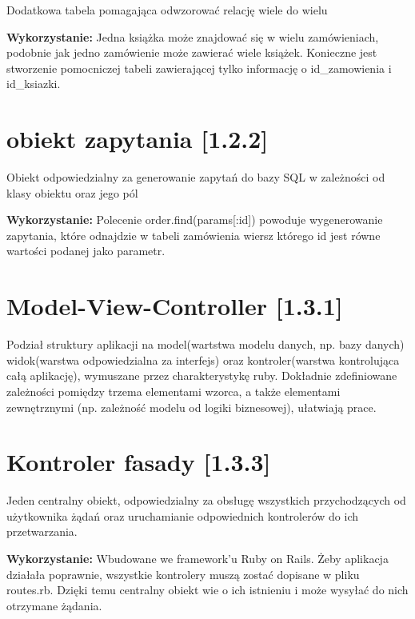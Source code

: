 \documentclass[pdflatex,11pt]{aghdpl}
\begin{document}
Dodatkowa tabela pomagająca odwzorować relację wiele do wielu

\textbf{Wykorzystanie:} Jedna książka może znajdować się w wielu zamówieniach, podobnie jak jedno zamówienie może zawierać wiele książek. Konieczne jest stworzenie pomocniczej tabeli zawierającej tylko informację o id\_zamowienia i id\_ksiazki.


\section{obiekt zapytania [1.2.2]}

Obiekt odpowiedzialny za generowanie zapytań do bazy SQL w zależności od klasy obiektu oraz jego pól

\textbf{Wykorzystanie:} Polecenie order.find(params[:id]) powoduje wygenerowanie zapytania, które odnajdzie w tabeli zamówienia wiersz którego id jest równe wartości podanej jako parametr.


\section{Model-View-Controller [1.3.1]}

Podział struktury aplikacji na model(wartstwa modelu danych, np. bazy danych) widok(warstwa odpowiedzialna za interfejs) oraz kontroler(warstwa kontrolująca całą aplikację), wymuszane przez charakterystykę ruby. Dokładnie zdefiniowane zależności pomiędzy trzema elementami wzorca, a także elementami zewnętrznymi (np. zależność modelu od logiki biznesowej), ułatwiają prace.



\section{Kontroler fasady [1.3.3]}

Jeden centralny obiekt, odpowiedzialny za obsługę wszystkich przychodzących od użytkownika żądań oraz uruchamianie odpowiednich kontrolerów do ich przetwarzania.

\textbf{Wykorzystanie:} Wbudowane we framework'u Ruby on Rails. Żeby aplikacja działała poprawnie, wszystkie kontrolery muszą zostać dopisane w pliku routes.rb. Dzięki temu centralny obiekt wie o ich istnieniu i może wysyłać do nich otrzymane żądania.
\end{document}
